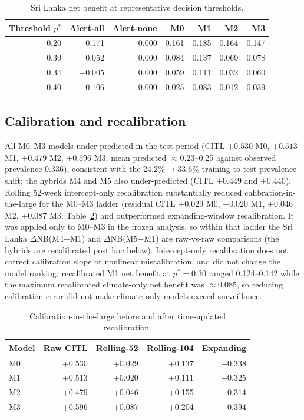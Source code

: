 \documentclass[11pt,a4paper]{article}
\begin{document}
\begin{table}[htbp]
\centering
\caption{Sri Lanka net benefit at representative decision thresholds.}
\label{tab:slthresh}
\small
\begin{tabular}{rrrrrrr}
\toprule
Threshold $p^*$ & Alert-all & Alert-none & M0 & M1 & M2 & M3 \\
\midrule
0.20 & 0.171 & 0.000 & 0.161 & 0.185 & 0.164 & 0.147 \\
0.30 & 0.052 & 0.000 & 0.084 & 0.137 & 0.069 & 0.078 \\
0.34 & $-0.005$ & 0.000 & 0.059 & 0.111 & 0.032 & 0.060 \\
0.40 & $-0.106$ & 0.000 & 0.025 & 0.083 & 0.012 & 0.039 \\
\bottomrule
\end{tabular}
\end{table}



\subsection{Calibration and recalibration}
All M0--M3 models under-predicted in the test period (CITL $+0.530$ M0, $+0.513$ M1, $+0.479$ M2, $+0.596$ M3; mean predicted $\approx$0.23--0.25 against observed prevalence 0.336), consistent with the 24.2\%$\rightarrow$33.6\% training-to-test prevalence shift; the hybrids M4 and M5 also under-predicted (CITL $+0.449$ and $+0.440$). Rolling 52-week intercept-only recalibration substantially reduced calibration-in-the-large for the M0--M3 ladder (residual CITL $+0.029$ M0, $+0.020$ M1, $+0.046$ M2, $+0.087$ M3; Table~\ref{tab:recal}) and outperformed expanding-window recalibration. It was applied only to M0--M3 in the frozen analysis, so within that ladder the Sri Lanka $\Delta$NB(M4$-$M1) and $\Delta$NB(M5$-$M1) are raw-vs-raw comparisons (the hybrids are recalibrated post hoc below). Intercept-only recalibration does not correct calibration slope or nonlinear miscalibration, and did not change the model ranking: recalibrated M1 net benefit at $p^*=0.30$ ranged 0.124--0.142 while the maximum recalibrated climate-only net benefit was $\approx0.085$, so reducing calibration error did not make climate-only models exceed surveillance.

\begin{table}[htbp]
\centering
\caption{Calibration-in-the-large before and after time-updated recalibration.}
\label{tab:recal}
\small
\begin{tabular}{lrrrr}
\toprule
Model & Raw CITL & Rolling-52 & Rolling-104 & Expanding \\
\midrule
M0 & +0.530 & +0.029 & +0.137 & +0.338 \\
M1 & +0.513 & +0.020 & +0.111 & +0.325 \\
M2 & +0.479 & +0.046 & +0.155 & +0.314 \\
M3 & +0.596 & +0.087 & +0.204 & +0.394 \\
\bottomrule
\end{tabular}
\end{table}
\end{document}
